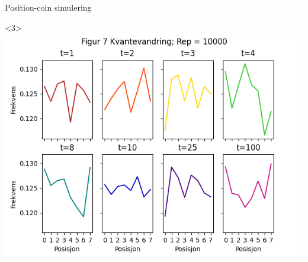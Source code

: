 \documentclass[norsk]{beamer}
\begin{document}
\begin{frame}{Position-coin simulering}
\begin{onlyenv}
			\end{onlyenv}
			\begin{onlyenv}<3>
				\includegraphics[scale=0.5]{Fig7GroverUniformMynt.png}
			\end{onlyenv}
	\end{frame}
\end{document}
